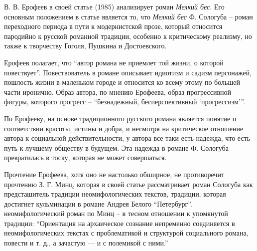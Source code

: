 \documentclass[12pt,a4paper]{article}
\begin{document}
В. В. Ерофеев в своей статье  (1985) анализирует роман \emph{Мелкий бес}. Его основным положением в статье является то, что \emph{Мелкий бес} Ф. Сологуба -- роман переходного периода в пути к модернистской прозе, который относится пародийно к русской романной традиции, особенно к критическому реализму, но также к творчеству Гоголя, Пушкина и Достоевского. \parencite[145.]{jerofeev1985}


Ерофеев полагает, что \enquote{автор романа не приемлет той жизни, о которой повествует}. Повествователь в романе описывает идиотизм и садизм персонажей, пошлость жизни в маленьком городе и относится ко всему этому по большей части иронично. Образ автора, по мнению Ерофеева, образ прогрессивной фигуры, которого прогресс -- \enquote{безнадежный, бесперспективный \enquote{прогрессизм}}. \Parencite[146.]{jerofeev1985}


По Ерофееву, на основе традиционного русского романа является понятие о соответствии красоты, истины и добра, и несмотря на критическое отношение автора к социальной действительности, у автора все-таки есть надежда, что есть путь к лучшему обществу в будущем. Эта надежда в романе Ф. Сологуба превратилась в тоску, которая не может совершаться.  \parencite[158.]{jerofeev1985}



Прочтение Ерофеева, хотя оно не настолько обширное, не противоречит прочтению З. Г. Минц, которая в  своей статье  \parencite*{mints2004} рассматривает роман Сологуба как предсташитель традиции неомифологических текстов, традиции, которая достигнет кульминации в романе Андрея Белого \enquote{Петербург}. неомифологический роман по Минц -- в тесном отношении к упомянутой традиции: \enquote{Ориентация на архаическое сознание непременно соединяется в неомифологических текстах с проблематикой и структурой социального романа, повести и т. д., а зачастую — и с полемикой с ними.} \Parencite[60.]{mints2004}
\end{document}
